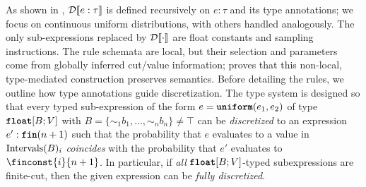 As shown in , $\mathcal{D}\llbracket e : \tau \rrbracket$ is defined recursively on $e : \tau$ and its type annotations; we focus on continuous uniform distributions, with others handled analogously. The only sub-expressions replaced by $\mathcal{D}\llbracket \cdot \rrbracket$ are float constants and sampling instructions. The rule schemata are local, but their selection and parameters come from globally inferred cut/value information;  proves that this non-local, type-mediated construction preserves semantics. Before detailing the rules, we outline how type annotations guide discretization. The type system is designed so that every typed sub-expression of the form 
$e = \textnormal{\ttfamily\bfseries uniform}(e_1, e_2 )$ of type $\textnormal{\ttfamily\bfseries float}[B;V]$ with $B=\{\sim_1\!\!b_1, \ldots, \sim_n\!\!b_n\} \neq \top$
%
can be \emph{discretized} to an expression $e' : \textnormal{\ttfamily\bfseries fin}(n+1)$ such that 
%
the probability that $e$ evaluates to a value in $\text{Intervals}(B)_i$ \emph{coincides} with the probability that $e'$ evaluates to $\finconst{i}{n+1}$. %
In particular, if \emph{all} $\textnormal{\ttfamily\bfseries float}[B;V]$-typed subexpressions are finite-cut, then the given expression can be \emph{fully discretized}. 
%


